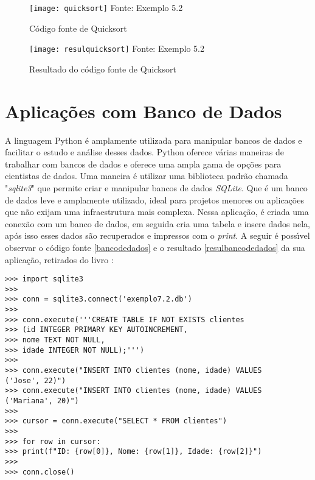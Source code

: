 \begin{figure}[H]
	\begin{center}
		\caption{C\'{o}digo fonte de Quicksort} \label{quicksort}
		\texttt{[image: quicksort]} 
		\newline
		Fonte: Exemplo 5.2
	\end{center}
\end{figure}

\begin{figure}[H]
	\begin{center}
		\caption{Resultado do c\'{o}digo fonte de Quicksort} \label{resulquicksort}
		\texttt{[image: resulquicksort]} 
		\newline
		Fonte: Exemplo 5.2
	\end{center}
\end{figure}

    \section{Aplica\c{c}\~{o}es com Banco de Dados}
A linguagem Python \'{e} amplamente utilizada para manipular bancos de dados e facilitar o estudo e an\'{a}lise desses dados. Python oferece v\'{a}rias maneiras de trabalhar com bancos de dados e oferece uma ampla gama de op\c{c}\~{o}es para cientistas de dados. Uma maneira \'{e} utilizar uma biblioteca padr\~{a}o chamada "\textsl{sqlite3}" que permite criar e manipular bancos de dados \textsl{SQLite}. Que \'{e} um banco de dados leve e amplamente utilizado, ideal para projetos menores ou aplica\c{c}\~{o}es que n\~{a}o exijam uma infraestrutura mais complexa. Nessa aplica\c{c}\~{a}o, \'{e} criada uma conex\~{a}o com um banco de dados, em seguida cria uma tabela e insere dados nela, ap\'{o}s isso esses dados s\~{a}o recuperados e impressos com o \textsl{print}. A seguir \'{e} poss\'{\i}vel observar o c\'{o}digo fonte \ref{bancodedados} e o resultado \ref{resulbancodedados} da sua aplica\c{c}\~{a}o, retirados do livro \cite{Guttag2021}: 

\begin{lstlisting}
>>> import sqlite3
>>> 
>>> conn = sqlite3.connect('exemplo7.2.db')
>>> 
>>> conn.execute('''CREATE TABLE IF NOT EXISTS clientes
>>> (id INTEGER PRIMARY KEY AUTOINCREMENT,
>>> nome TEXT NOT NULL,
>>> idade INTEGER NOT NULL);''')
>>> 
>>> conn.execute("INSERT INTO clientes (nome, idade) VALUES 
('Jose', 22)")
>>> conn.execute("INSERT INTO clientes (nome, idade) VALUES 
('Mariana', 20)")
>>> 
>>> cursor = conn.execute("SELECT * FROM clientes")
>>> 
>>> for row in cursor:
>>> print(f"ID: {row[0]}, Nome: {row[1]}, Idade: {row[2]}")
>>> 
>>> conn.close()
\end{lstlisting}

